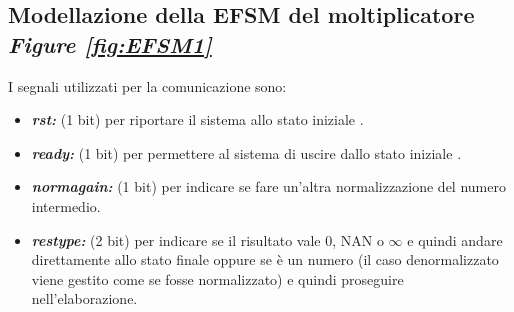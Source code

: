 \documentclass[]{IEEEtran}
\begin{document}
\subsection{Modellazione della EFSM del moltiplicatore {\it Figure \ref{fig:EFSM1}}}
I segnali utilizzati per la comunicazione sono:
\begin{itemize}
\item {\it\bf rst:} (1 bit) per riportare il sistema allo stato iniziale .
\item {\it\bf ready:} (1 bit) per permettere al sistema di uscire dallo stato iniziale .
\item {\it\bf norm\textunderscore again:} (1 bit) per indicare se fare un'altra normalizzazione del numero intermedio.
\item {\it\bf res\textunderscore type:} (2 bit) per indicare se il risultato vale 0, NAN o \(\infty\) e quindi andare direttamente allo stato finale oppure se è un numero (il caso denormalizzato viene gestito come se fosse normalizzato) e quindi proseguire nell'elaborazione.
\end{itemize}
\end{document}
